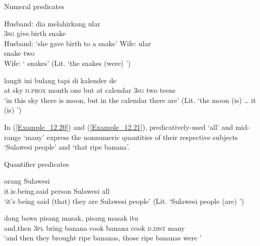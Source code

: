 \begin{styleExampleTitle}
Numeral predicates
\end{styleExampleTitle}
\ea
\label{Example_12.18}
\ea
\label{Example_12.18a}
\gll Husband:  dia  melahirkang  ular\\ %
  {}   \textsc{3sg}  give.birth  snake\\
\glt Husband: ‘she gave birth to a snake’
\vspace{5pt}
\ex
\label{Example_12.18b}
\gll    Wife:  ular  \\
 {}    snake  two\\
\glt Wife: ‘ snakes’ (Lit. ‘the snakes (were) ’) \textstyleExampleSource{[081006-022-CvEx.0002-0003]}
\z
\z

\ea
\label{Example_12.19}
 {langit} {ini} {bulang} {} {tapi} {di} {kalender} {de} {} {}\\ %
 at  sky  \textsc{d.prox}  month  one  but  at  calendar  \textsc{3sg}  two  teens\\
\glt 
‘in this sky there is moon, but in the calendar there are’ (Lit. ‘the moon (is)  {\ldots} it (is) ’) \textstyleExampleSource{[081109-007-JR.0002]}
\z


In (\ref{Example_12.20}) and (\ref{Example_12.21}), predicatively-used   ‘all’ and mid-range   ‘many’ express the nonnumeric quantities of their respective subjects  ‘Sulawesi people’ and  ‘that ripe banana’.


\begin{styleExampleTitle}
Quantifier predicates
\end{styleExampleTitle}

\ea
\label{Example_12.20}
 {orang} {Sulawesi} {}\\ %
 it.is.being.said  person  Sulawesi  all\\
\glt 
‘it’s being said (that) they are  Sulawesi people’ (Lit. ‘Sulawesi people (are) ’) \textstyleExampleSource{[081029-005-Cv.0106]}
\z

\ea
\label{Example_12.21}
 {dong} {bawa} {pisang} {masak,} {pisang} {masak} {itu} {}\\ %
 and.then  \textsc{3pl}  bring  banana  cook  banana  cook  \textsc{d.dist}  many\\
\glt
‘and then they brought ripe bananas, those ripe bananas were ’ \textstyleExampleSource{[081006-023-CvEx.0071]}
\z

